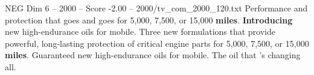 \begin{textsample}{NEG Dim 6 – 2000 – Score -2.00 – 2000/tv\_com\_2000\_120.txt}  \label{ex:f6_neg_005}
Performance and protection that goes and goes for 5,000, 7,500, or 15,000 \textbf{miles}. \textbf{Introducing} new high-endurance oils for mobile.
Three new formulations that provide powerful, long-lasting protection of critical engine parts for 5,000, 7,500, or 15,000 \textbf{miles}.
Guaranteed new high-endurance oils for mobile.
The oil that 's changing all.

\end{textsample}
